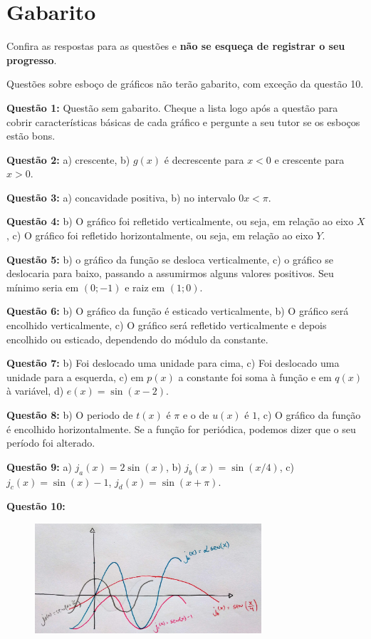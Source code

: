 \documentclass[main_estudante.tex]{subfiles}
\begin{document}
\newpage

\section{Gabarito}

Confira as respostas para as questões e \textbf{não se esqueça de registrar o seu progresso}.

Questões sobre esboço de gráficos não terão gabarito, com exceção da questão 10.

\noindent\textbf{Questão 1:} Questão sem gabarito. Cheque a lista logo após a questão para cobrir características básicas de cada gráfico e pergunte a seu tutor se os esboços estão bons.

\noindent\textbf{Questão 2:} a) crescente, b) $g(x)$ é decrescente para $x<0$ e crescente para $x>0$.

\noindent\textbf{Questão 3:} a) concavidade positiva, b) no intervalo $0x<\pi$.

\noindent\textbf{Questão 4:} b) O gráfico foi refletido verticalmente, ou seja, em relação ao eixo $X$, c) O gráfico foi refletido horizontalmente, ou seja, em relação ao eixo $Y$.

\noindent\textbf{Questão 5:} b) o gráfico da função se desloca verticalmente, c) o gráfico se deslocaria para baixo, passando a assumirmos alguns valores positivos. Seu mínimo seria em $(0;-1)$ e raiz em $(1;0)$.

\noindent\textbf{Questão 6:} b) O gráfico da função é esticado verticalmente, b) O gráfico será encolhido verticalmente, c) O gráfico será refletido verticalmente e depois encolhido ou esticado, dependendo do módulo da constante.

\noindent\textbf{Questão 7:} b) Foi deslocado uma unidade para cima, c) Foi deslocado uma unidade para a esquerda, c) em $p(x)$ a constante foi soma à função e em $q(x)$ à variável, d) $e(x)=\sin(x-2)$.

\noindent\textbf{Questão 8:} b) O periodo de $t(x)$ é $\pi$ e o de $u(x)$ é $1$, c) O gráfico da função é encolhido horizontalmente. Se a função for periódica, podemos dizer que o seu período foi alterado.

\noindent\textbf{Questão 9:} a) $j_a(x)=2\sin(x)$, b) $j_b(x)=\sin(x/4)$, c)$j_c(x)=\sin(x)-1$, $j_d(x)=\sin(x+\pi)$.

\noindent\textbf{Questão 10:}

\begin{figure}[h]
\centering
\includegraphics[width=0.75\textwidth]{./img/c7g10.jpg}
\end{figure}
\end{document}
